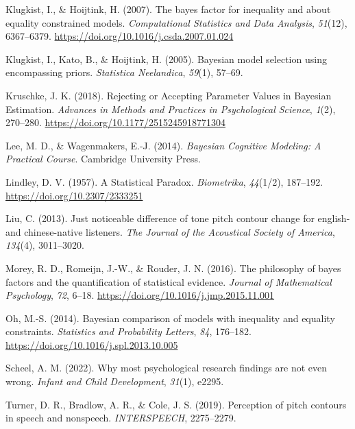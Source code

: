 \documentclass[
  doc,
  floatsintext,
  longtable,
  nolmodern,
  notxfonts,
  notimes,
  colorlinks=true,linkcolor=blue,citecolor=blue,urlcolor=blue]{apa7}
\newlength{\cslhangindent}
\newenvironment{CSLReferences}[2] %
 {\begin{list}{}{%
  \setlength{\itemindent}{0pt}
  \setlength{\leftmargin}{0pt}
  \setlength{\parsep}{0pt}
  \ifodd #1
   \setlength{\leftmargin}{\cslhangindent}
   \setlength{\itemindent}{-1\cslhangindent}
  \fi
  \setlength{\itemsep}{#2\baselineskip}}}
 {\end{list}}
\begin{document}
\begin{CSLReferences}{1}{0}
Klugkist, I., \& Hoijtink, H. (2007). The bayes factor for inequality
and about equality constrained models. \emph{Computational Statistics
and Data Analysis}, \emph{51}(12), 6367--6379.
\url{https://doi.org/10.1016/j.csda.2007.01.024}

Klugkist, I., Kato, B., \& Hoijtink, H. (2005). Bayesian model selection
using encompassing priors. \emph{Statistica Neelandica}, \emph{59}(1),
57--69.

Kruschke, J. K. (2018). Rejecting or {Accepting Parameter Values} in
{Bayesian Estimation}. \emph{Advances in Methods and Practices in
Psychological Science}, \emph{1}(2), 270--280.
\url{https://doi.org/10.1177/2515245918771304}

Lee, M. D., \& Wagenmakers, E.-J. (2014). \emph{Bayesian {Cognitive
Modeling}: {A Practical Course}}. Cambridge University Press.

Lindley, D. V. (1957). A {Statistical Paradox}. \emph{Biometrika},
\emph{44}(1/2), 187--192. \url{https://doi.org/10.2307/2333251}

Liu, C. (2013). Just noticeable difference of tone pitch contour change
for english-and chinese-native listeners. \emph{The Journal of the
Acoustical Society of America}, \emph{134}(4), 3011--3020.

Morey, R. D., Romeijn, J.-W., \& Rouder, J. N. (2016). The philosophy of
bayes factors and the quantification of statistical evidence.
\emph{Journal of Mathematical Psychology}, \emph{72}, 6--18.
\url{https://doi.org/10.1016/j.jmp.2015.11.001}

Oh, M.-S. (2014). Bayesian comparison of models with inequality and
equality constraints. \emph{Statistics and Probability Letters},
\emph{84}, 176--182. \url{https://doi.org/10.1016/j.spl.2013.10.005}

Scheel, A. M. (2022). Why most psychological research findings are not
even wrong. \emph{Infant and Child Development}, \emph{31}(1), e2295.

Turner, D. R., Bradlow, A. R., \& Cole, J. S. (2019). Perception of
pitch contours in speech and nonspeech. \emph{INTERSPEECH}, 2275--2279.


\end{CSLReferences}
\end{document}
